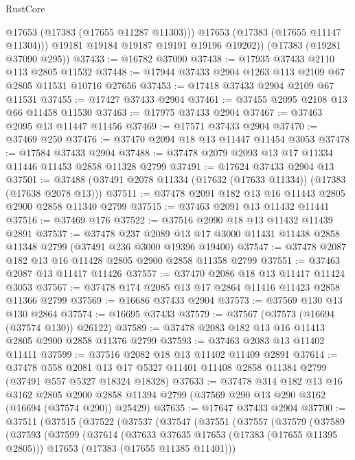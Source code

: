 \begin{lexlean}{RustCore}
\begin{coremodule}
            @17653
            (@17383 (@17655 @11287 @11303)))
          @17653
          (@17383 (@17655 @11147 @11304)))
        @19181
        @19184
        @19187
        @19191
        @19196
        @19202))
    (@17383 (@19281 @37090 @295))
@37433 := @16782 @37090
@37438 := @17935 @37433 @2110 @113 @2805 @11532
@37448 := @17944 @37433 @2904 @1263 @113 @2109 @67 @2805 @11531 @10716 @27656
@37453 := @17418 @37433 @2904 @2109 @67 @11531
@37455 := @17427 @37433 @2904
@37461 := @37455 @2095 @2108 @13 @66 @11458 @11530
@37463 := @17975 @37433 @2904
@37467 := @37463 @2095 @13 @11447 @11456
@37469 := @17571 @37433 @2904
@37470 := @37469 @250
@37476 := @37470 @2094 @18 @13 @11447 @11454 @3053
@37478 := @17584 @37433 @2904
@37488 := @37478 @2079 @2093 @13 @17 @11334 @11446 @11453 @2858 @11328 @2799
@37491 := @17624 @37433 @2904 @13
@37501 := @37488 (@37491 @2078 @11334 (@17632 (@17633 @11334)) (@17383 (@17638 @2078 @13)))
@37511 := @37478 @2091 @182 @13 @16 @11443 @2805 @2900 @2858 @11340 @2799
@37515 := @37463 @2091 @13 @11432 @11441
@37516 := @37469 @176
@37522 := @37516 @2090 @18 @13 @11432 @11439 @2891
@37537 := @37478
    @237
    @2089
    @13
    @17
    @3000
    @11431
    @11438
    @2858
    @11348
    @2799
    (@37491 @236 @3000 @19396 @19400)
@37547 := @37478 @2087 @182 @13 @16 @11428 @2805 @2900 @2858 @11358 @2799
@37551 := @37463 @2087 @13 @11417 @11426
@37557 := @37470 @2086 @18 @13 @11417 @11424 @3053
@37567 := @37478 @174 @2085 @13 @17 @2864 @11416 @11423 @2858 @11366 @2799
@37569 := @16686 @37433 @2904
@37573 := @37569 @130 @13 @130 @2864
@37574 := @16695 @37433
@37579 := @37567 (@37573 (@16694 (@37574 @130)) @26122)
@37589 := @37478 @2083 @182 @13 @16 @11413 @2805 @2900 @2858 @11376 @2799
@37593 := @37463 @2083 @13 @11402 @11411
@37599 := @37516 @2082 @18 @13 @11402 @11409 @2891
@37614 := @37478
    @558
    @2081
    @13
    @17
    @5327
    @11401
    @11408
    @2858
    @11384
    @2799
    (@37491 @557 @5327 @18324 @18328)
@37633 := @37478
    @314
    @182
    @13
    @16
    @3162
    @2805
    @2900
    @2858
    @11394
    @2799
    (@37569 @290 @13 @290 @3162 (@16694 (@37574 @290)) @25429)
@37635 := @17647 @37433 @2904
@37700 := @37511
    (@37515
      (@37522
        (@37537
          (@37547
            (@37551
              (@37557
                (@37579
                  (@37589
                    (@37593
                      (@37599
                        (@37614
                          (@37633 @37635 @17653 (@17383 (@17655 @11395 @2805)))
                          @17653
                          (@17383 (@17655 @11385 @11401)))

\end{coremodule}
\end{lexlean}
